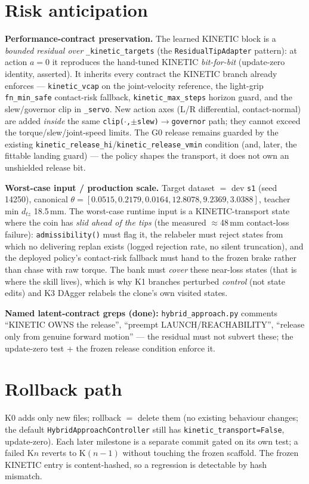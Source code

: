 \documentclass[11pt]{article}
\newcommand{\code}[1]{\texttt{\small #1}}
\begin{document}
\section{Risk anticipation}
\textbf{Performance-contract preservation.} The learned KINETIC block is a \emph{bounded residual over}
\code{\_kinetic\_targets} (the \code{ResidualTipAdapter} pattern): at action $a=0$ it reproduces the hand-tuned KINETIC
\emph{bit-for-bit} (update-zero identity, asserted). It inherits every contract the KINETIC branch already enforces ---
\code{kinetic\_vcap} on the joint-velocity reference, the light-grip \code{fn\_min\_safe} contact-risk fallback,
\code{kinetic\_max\_steps} horizon guard, and the slew/governor clip in \code{\_servo}. New action axes (L/R
differential, contact-normal) are added \emph{inside} the same \code{clip($\cdot$,$\pm$slew)$\to$governor} path;
they cannot exceed the torque/slew/joint-speed limits. The G0 release remains guarded by the existing
\code{kinetic\_release\_hi}/\code{kinetic\_release\_vmin} condition (and, later, the fittable landing guard) --- the
policy shapes the transport, it does not own an unshielded release bit.

\smallskip\noindent\textbf{Worst-case input / production scale.} Target dataset $=$ dev \code{s1} (seed 14250),
canonical $\theta=[0.0515,0.2179,0.0164,12.8078,9.2369,3.0388]$, teacher min $d_{tz}$ 18.5\,mm. The worst-case runtime
input is a KINETIC-transport state where the coin has \emph{slid ahead of the tips} (the measured $\approx$48\,mm
contact-loss failure): \code{admissibility()} must flag it, the relabeler must reject states from which no delivering
replan exists (logged rejection rate, no silent truncation), and the deployed policy's contact-risk fallback must hand to
the frozen brake rather than chase with raw torque. The bank must \emph{cover} these near-loss states (that is where the
skill lives), which is why K1 branches perturbed \emph{control} (not state edits) and K3 DAgger relabels the clone's own
visited states.

\smallskip\noindent\textbf{Named latent-contract greps (done):} \code{hybrid\_approach.py} comments ``KINETIC OWNS the
release'', ``preempt LAUNCH/REACHABILITY'', ``release only from genuine forward motion'' --- the residual must not
subvert these; the update-zero test + the frozen release condition enforce it.

\section{Rollback path}
K0 adds only new files; rollback $=$ delete them (no existing behaviour changes; the default
\code{HybridApproachController} still has \code{kinetic\_transport=False}, update-zero). Each later milestone is a separate
commit gated on its own test; a failed K$n$ reverts to K$(n{-}1)$ without touching the frozen scaffold. The frozen KINETIC
entry is content-hashed, so a regression is detectable by hash mismatch.
\end{document}
